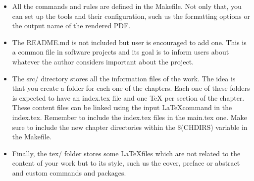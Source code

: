 \begin{itemize}
  \item All the commands and rules are defined in the Makefile. Not only that,
        you can set up the tools and their configuration, such us the
        formatting options or the output name of the rendered PDF.

  \item The README.md is not included but user is encouraged to add one. This is a
        common file in software projects and its goal is to inform users about
        whatever the author considers important about the project.

  \item The src/ directory stores all the information files of the work. The idea
        is that you create a folder for each one of the chapters. Each one of
        these folders is expected to have an index.tex file and one TeX per
        section of the chapter. These content files can be linked using the
        input \LaTeX command in the index.tex. Remember to include the index.tex
        files in the main.tex one. Make sure to include the new chapter
	directories within the \$(CHDIRS) variable in the Makefile.

  \item Finally, the tex/ folder stores some \LaTeX files which are not related to
        the content of your work but to its style, such us the cover, preface or
        abstract and custom commands and packages.

\end{itemize}
